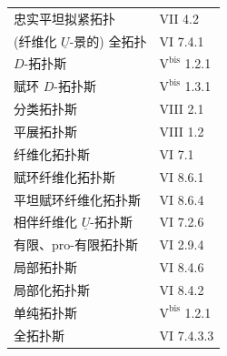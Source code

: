 \begin{longtable}{@{}p{.68\linewidth}p{.27\linewidth}@{}}
忠实平坦拟紧拓扑 & VII 4.2\\
(纤维化 $\underline U$-景的) 全拓扑 & VI 7.4.1\\
$D$-拓扑斯 & $\mathrm{V}^{\mathrm{bis}}$ 1.2.1\\
赋环 $D$-拓扑斯 & $\mathrm{V}^{\mathrm{bis}}$ 1.3.1\\
分类拓扑斯 & VIII 2.1\\
平展拓扑斯 & VIII 1.2\\
纤维化拓扑斯 & VI 7.1\\
赋环纤维化拓扑斯 & VI 8.6.1\\
平坦赋环纤维化拓扑斯 & VI 8.6.4\\
相伴纤维化 $\underline U$-拓扑斯 & VI 7.2.6\\
有限、pro-有限拓扑斯 & VI 2.9.4\\
局部拓扑斯 & VI 8.4.6\\
局部化拓扑斯 & VI 8.4.2\\[.7em]
单纯拓扑斯 & $\mathrm{V}^{\mathrm{bis}}$ 1.2.1\\
全拓扑斯 & VI 7.4.3.3\\
\end{longtable}
\endgroup

